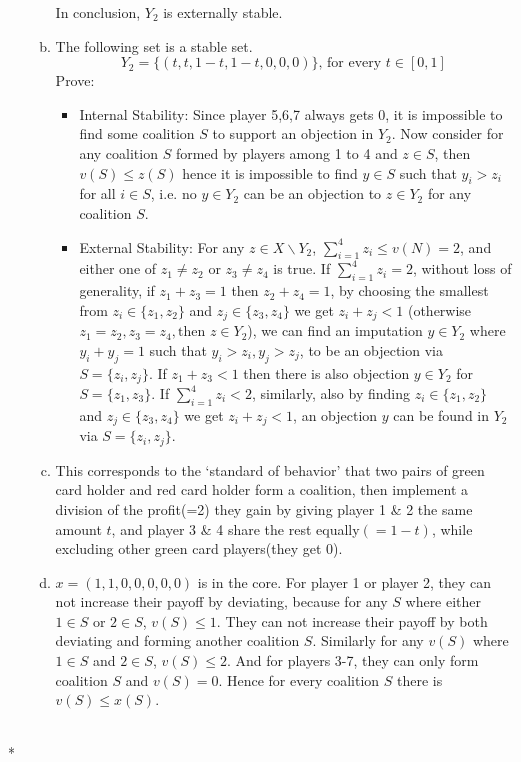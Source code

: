 \documentclass[a4paper,12pt]{article}
\begin{document}
\begin{enumerate}
\begin{enumerate}[(a)]
\begin{itemize}
  \end{itemize}
  In conclusion, $Y_2$ is externally stable.
\item
    The following set is a stable set.
    \begin{displaymath}
        Y_2=\{(t,t,1-t,1-t,0,0,0)\} \textrm{, for every } t\in [0,1]
    \end{displaymath}
    Prove:
    \begin{itemize}
    \item
        Internal Stability: Since player 5,6,7 always gets 0,
        it is impossible to find some coalition $S$ to support an objection in $Y_2$.
        Now consider for any coalition $S$ formed by players among 1 to 4 and $z\in S$,
        then $v(S) \le z(S)$ hence it is impossible to find $y\in S$ such that $y_i>z_i$ for all $i \in S$,
        i.e. no $y\in Y_2$ can be an objection to $z\in Y_2$ for any coalition $S$.
    \item
        External Stability: %
        For any $z\in X\backslash Y_2$, $\sum^4_{i=1} z_i \le v(N)=2$, and either one of $z_1 \ne z_2$ or $z_3 \ne z_4$ is true.
        If $\sum^4_{i=1} z_i=2$, without loss of generality, if $z_1+z_3=1$ then $z_2+z_4=1$,
        by choosing the smallest from $z_i \in \{z_1,z_2\}$ and $z_j \in \{z_3,z_4\}$ we get $z_i+z_j < 1$
        (otherwise $z_1=z_2,z_3=z_4, \textrm{then } z\in Y_2$),
        we can find an imputation $y\in Y_2$ where $y_i+y_j=1$ such that $y_i>z_i,y_j>z_j$,
        to be an objection via $S=\{z_i,z_j\}$.
        If $z_1+z_3<1$ then there is also objection $y\in Y_2$ for $S=\{z_1,z_3\}$.
        If $\sum^4_{i=1} z_i<2$, similarly,
        also by finding $z_i \in \{z_1,z_2\}$ and $z_j \in \{z_3,z_4\}$ we get $z_i+z_j < 1$,
        an objection $y$ can be found in $Y_2$ via $S=\{z_i,z_j\}$.
    \end{itemize}
\item
    This corresponds to the `standard of behavior' that two pairs of  green card holder and red card holder form a coalition,
    then implement a division of the profit(=2) they gain by giving player 1 \& 2 the same amount $t$,
    and player 3 \& 4 share the rest equally$(=1-t)$,
    while excluding other green card players(they get 0).
\item
$x=(1,1,0,0,0,0,0)$ is in the core. For player 1 or player 2, they can not increase their payoff by deviating,
because for any $S$ where either $1\in S$ or $2 \in S$, $v(S) \le 1$.
They can not increase their payoff by both deviating and forming another coalition $S$.
Similarly for any $v(S)$ where $1 \in S$ and $2 \in S$, $v(S) \le 2$.
And for players 3-7, they can only form coalition $S$ and $v(S)=0$.
Hence for every coalition $S$ there is $v(S) \le x(S)$.

\end{enumerate}

\end{enumerate}

~\\*
\end{document}

